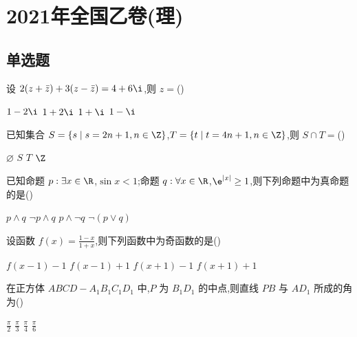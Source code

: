 \chapter{2021年全国乙卷(理)}

\section{单选题}

\begin{problem}
设 \(2(z+\bar z)+3(z-\bar z)=4+6\i\),则 \(z=\)(\quad)

\choices
    {\(1-2\i\)}
    {\(1+2\i\)}
    {\(1+\i\)}
    {\(1-\i\)}

\end{problem}

\begin{problem}
已知集合 \(S=\{s\mid s=2n+1,n\in\Z\}\),\(T=\{t\mid t=4n+1,n\in\Z\}\),则 \(S\cap T=\)(\quad)

\choices
    {\(\varnothing\)}
    {\(S\)}
    {\(T\)}
    {\(\Z\)}

\end{problem}

\begin{problem}
已知命题 \(p:\exists x\in \R\),\(\sin x<1\);命题 \(q:\forall x\in \R\),\(\e^{|x|}\ge 1\),则下列命题中为真命题的是(\quad)

\choices
    {\(p\wedge q\)}
    {\(\neg p\wedge q\)}
    {\(p\wedge \neg q\)}
    {\(\neg\left( p\vee q \right)\)}

\end{problem}

\begin{problem}
设函数 \(f(x)=\frac{1-x}{1+x}\),则下列函数中为奇函数的是(\quad)

\choices
    {\(f(x-1)-1\)}
    {\(f(x-1)+1\)}
    {\(f(x+1)-1\)}
    {\(f(x+1)+1\)}

\end{problem}

\begin{problem}
在正方体 \(ABCD-A_1B_1C_1D_1\) 中,\(P\) 为 \(B_1D_1\) 的中点,则直线 \(PB\) 与 \(AD_1\) 所成的角为(\quad)


\choices
    {\(\frac{\pi}{2}\)}
    {\(\frac{\pi}{3}\)}
    {\(\frac{\pi}{4}\)}
    {\(\frac{\pi}{6}\)}

\end{problem}

